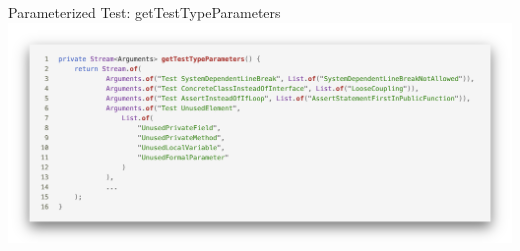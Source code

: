 \documentclass{sdqbeamer}
\begin{document}
\begin{frame}[fragile]{Parameterized Test: getTestTypeParameters}
    \vspace{-0.5cm}
    \hspace{-0.7cm}
    \includegraphics[scale=0.23]{logos/CodeGetTestTypeParameters.png}
\end{frame}
\end{document}
